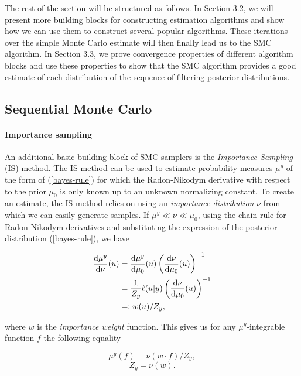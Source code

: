 The rest of the section will be structured as follows. In Section 3.2, we will present more building blocks for constructing estimation algorithms and show how we can use them to construct several popular algorithms. These iterations over the simple Monte Carlo estimate will then finally lead us to the SMC algorithm. In Section 3.3, we prove convergence properties of different algorithm blocks and use these properties to show that the SMC algorithm provides a good estimate of each distribution of the sequence of filtering posterior distributions.

\subsection{Sequential Monte Carlo}

\paragraph{Importance sampling} An additional basic building block of SMC samplers is the \textit{Importance Sampling} (IS) method. The IS method can be used to estimate probability measures $\mu^y$ of the form of (\ref{bayes-rule}) for which the Radon-Nikodym derivative with respect to the prior $\mu_0$ is only known up to an unknown normalizing constant. To create an estimate, the IS method relies on using an \textit{importance distribution} $\nu$ from which we can easily generate samples. If $\mu^y \ll \nu \ll \mu_0$, using the chain rule for Radon-Nikodym derivatives and substituting the expression of the posterior distribution (\ref{bayes-rule}), we have

\begin{align*}
  \frac{\text{d}\mu^y}{\text{d}\nu}(u)
  &= \frac{\text{d}\mu^y}{\text{d}\mu_0}(u)\left(\frac{\text{d}\nu}{\text{d}\mu_0}(u) \right)^{-1}\\
  &= \frac1{Z_y}\ell(u|y)\left(\frac{\text{d}\nu}{\text{d}\mu_0}(u) \right)^{-1}\\
  &=: w(u) / Z_y,
\end{align*}

where $w$ is the \textit{importance weight} function. This gives us for any $\mu^y$-integrable function $f$ the following equality

\begin{equation*}
  \mu^y(f) =  \nu(w \cdot f) / Z_y,
\end{equation*}
\begin{equation*}
  Z_y = \nu(w).
\end{equation*}

